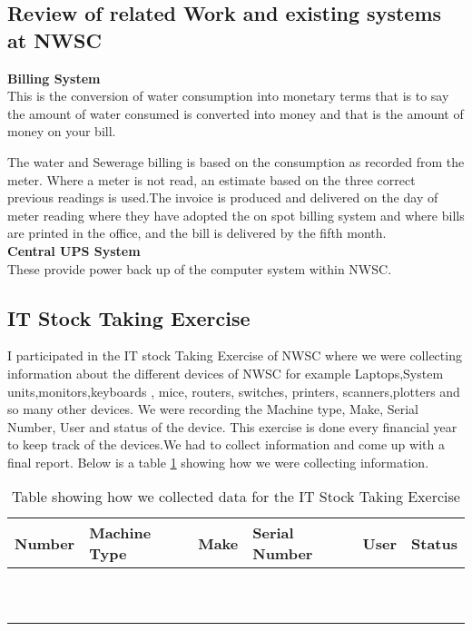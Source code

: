 \documentclass{article}
\begin{document}
\subsection{Review of related Work and existing systems at NWSC}
\textbf{Billing System}\\
This is the conversion of water consumption into monetary terms that is to say the amount of water consumed is converted into money and that is the amount of money on your bill.
\par  The water and Sewerage billing is based on the consumption as recorded from the meter. Where a meter is not read, an estimate based on the three correct previous readings is used.The invoice is produced and delivered on the day of meter reading where they have adopted the on spot billing system and where bills are printed in the office, and the bill is delivered by the fifth month.\\
\textbf{Central UPS System }\\
These provide power back up of the computer system within NWSC.
\subsection{IT Stock Taking Exercise}
I participated in the IT stock Taking Exercise of NWSC where we were collecting information about the different devices of NWSC for example Laptops,System units,monitors,keyboards , mice, routers, switches, printers, scanners,plotters and so many other devices. We were recording the Machine type, Make, Serial Number, User and status of the device. This exercise is done every financial year to keep track of the devices.We had to collect information and come up with a final report. Below is a  table \ref{table:1} showing how we were collecting information.
\begin{table}[H]
\centering
\begin{tabu} to 0.8\textwidth { | X[c] | X[c] | X[c] | X[c] | X[c] | X[c] | }
 \hline
 Number &  Machine Type & Make &Serial Number &User &Status\\
 \hline
 &  & & & & \\
\hline
 &  & & & & \\
\hline
 &  & & & & \\
\hline
 &  & & & & \\
\hline
 &  & & & & \\
\hline
 &  & & & & \\
\hline
 &  & & & & \\
\hline
 &  & & & & \\
\hline
 &  & & & & \\
\hline
 &  & & & & \\
\hline
\end{tabu}
\caption{Table showing how we collected data for the  IT Stock Taking Exercise}
\label{table:1}
\end{table}
\end{document}
